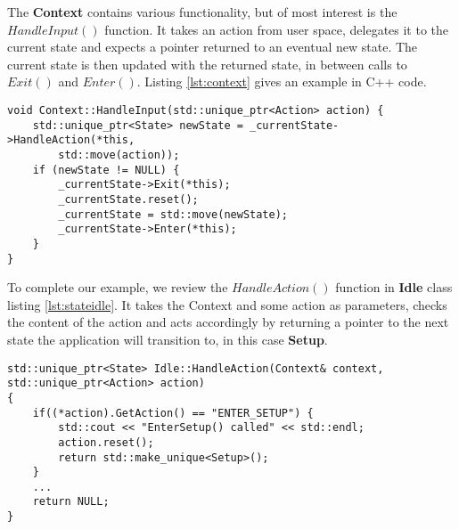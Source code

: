 The \textbf{Context} contains various functionality, but of most interest is the $HandleInput()$ function. It takes an action from user space, delegates it to the current state and expects a pointer returned to an eventual new state. The current state is then updated with the returned state, in between calls to $Exit()$ and $Enter()$. Listing \ref{lst:context} gives an example in C++ code. \\

\begin{lstlisting}[style=customc++,caption={The Context class holds the current state among other variables, such as best chromosome so far and parameters. Here is showed the function HandleInput() called from user side.},label={lst:context}]
void Context::HandleInput(std::unique_ptr<Action> action) {
	std::unique_ptr<State> newState = _currentState->HandleAction(*this,
		std::move(action));
	if (newState != NULL) {
		_currentState->Exit(*this);
		_currentState.reset();
		_currentState = std::move(newState);
		_currentState->Enter(*this);
	}
}
\end{lstlisting}

To complete our example, we review the $HandleAction()$ function in \textbf{Idle} class listing \ref{lst:stateidle}. It takes the Context and some action as parameters, checks the content of the action and acts accordingly by returning a pointer to the next state the application will transition to, in this case \textbf{Setup}. \newpage

\begin{lstlisting}[style=customc++,caption={The HandleAction() function in state Idle.},label={lst:stateidle}]
std::unique_ptr<State> Idle::HandleAction(Context& context, std::unique_ptr<Action> action)
{
	if((*action).GetAction() == "ENTER_SETUP") {
		std::cout << "EnterSetup() called" << std::endl;
		action.reset();
		return std::make_unique<Setup>();
	}
	...
	return NULL;
}
\end{lstlisting}
